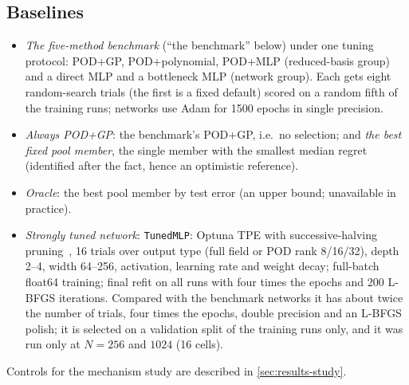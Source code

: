 \subsection{Baselines}
\begin{itemize}
\item \emph{The five-method benchmark} (``the benchmark'' below) under one tuning protocol: POD+GP, POD+polynomial, POD+MLP (reduced-basis group) and a direct MLP and a bottleneck MLP (network group). Each gets eight random-search trials (the first is a fixed default) scored on a random fifth of the training runs; networks use Adam for 1500 epochs in single precision.
\item \emph{Always POD+GP}: the benchmark's POD+GP, i.e.\ no selection; and \emph{the best fixed pool member}, the single member with the smallest median regret (identified after the fact, hence an optimistic reference).
\item \emph{Oracle}: the best pool member by test error (an upper bound; unavailable in practice).
\item \emph{Strongly tuned network}: \texttt{TunedMLP}: Optuna TPE with successive-halving pruning~\cite{akiba2019,li2018hyperband}, 16 trials over output type (full field or POD rank 8/16/32), depth 2--4, width 64--256, activation, learning rate and weight decay; full-batch float64 training; final refit on all runs with four times the epochs and 200 L-BFGS iterations. Compared with the benchmark networks it has about twice the number of trials, four times the epochs, double precision and an L-BFGS polish; it is selected on a validation split of the training runs only, and it was run only at $N=256$ and $1024$ (16 cells).
\end{itemize}
Controls for the mechanism study are described in \cref{sec:results-study}.

